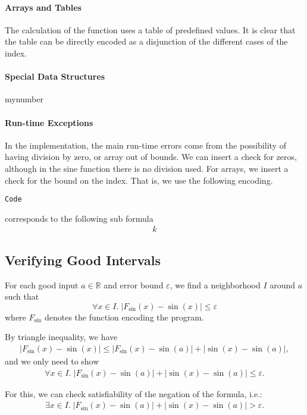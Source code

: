 \paragraph{Arrays and Tables}

The calculation of the function uses a table of predefined values. It is clear that the table can be directly encoded as a disjunction of the different cases of the index. 

\paragraph{Special Data Structures}

mynumber

\paragraph{Run-time Exceptions}

In the implementation, the main run-time errors come from the possibility of having division by zero, or array out of bounds. We can insert a check for zeros, although in the sine function there is no division used. For arrays, we insert a check for the bound on the index. That is, we use the following encoding. 
\begin{verbatim}
Code
\end{verbatim}
corresponds to the following sub formula
\begin{eqnarray*}
k
\end{eqnarray*}


\subsection{Verifying Good Intervals}

For each good input $a\in \mathbb{R}$ and error bound $\varepsilon$,
we find a neighborhood $I$ around $a$ such that
$$\forall x\in I.\; |F_{\sin}(x)-\sin(x)|\leq \varepsilon$$
where $F_{\sin}$ denotes the function encoding the program.

By triangle inequality, we have
\begin{eqnarray}
|F_{\sin}(x) - \sin(x)| \leq |F_{\sin}(x) - \sin(a)| + |\sin(x) - \sin(a)|,
\end{eqnarray}
and we only need to show
\begin{eqnarray}
\forall x\in I.\; |F_{\sin}(x) - \sin(a)| + |\sin(x) - \sin(a)| \leq \varepsilon.
\end{eqnarray}

For this, we can check satisfiability of the negation of the formula, i.e.:
\begin{eqnarray}
\exists x\in I.\; |F_{\sin}(x) - \sin(a)| + |\sin(x) - \sin(a)| > \varepsilon.
\end{eqnarray}

